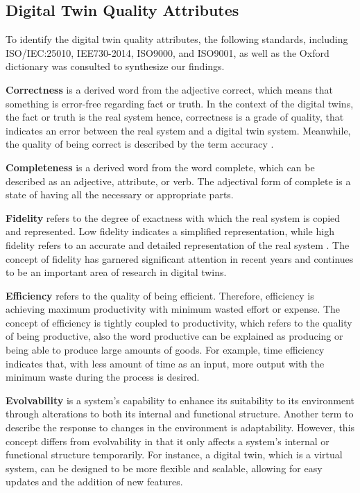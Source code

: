 \documentclass{llncs}
\begin{document}
    \subsection{Digital Twin Quality Attributes}\label{section:Digital Twin Quality Attributes}
    To identify the digital twin quality attributes, the following standards, including ISO/IEC:25010, IEE730-2014, ISO9000, and ISO9001, 
    as well as the Oxford dictionary was consulted to 
    synthesize our findings\cite{ISO9000,ISO90012015,ISO/IEC:25010,IEE730-2014, OxfordDictionary}.
    
    \textbf{Correctness} is a  derived word from the adjective correct, which means that something is error-free regarding fact or truth. 
    In the context of the digital twins, the fact or truth is the real system hence, correctness is a grade of quality, 
    that indicates an error between the real system and a digital twin system.
    Meanwhile, the quality of being correct is described by the term accuracy \cite{OxfordDictionary}. 
    
    \textbf{Completeness} is a derived word from the word complete, which can be described as an adjective, attribute, or verb\cite{OxfordDictionary}. 
    The adjectival form of complete is a state of having all the necessary or appropriate parts\cite{OxfordDictionary}.

    \textbf{Fidelity} refers to the degree of exactness with which the real system is copied and represented. 
    Low fidelity indicates a simplified representation, while high fidelity refers to an accurate and detailed representation of the real system \cite{Review2}. 
    The concept of fidelity has garnered significant attention in recent
    years and continues to be an important area of research in digital twins\cite{Review2}\cite{Review1}.

    \textbf{Efficiency} refers to the quality of being efficient\cite{OxfordDictionary}. Therefore, efficiency is achieving
    maximum productivity with minimum wasted effort or expense. The concept of efficiency is tightly coupled to productivity, which refers to the quality of being productive,
    also the word productive can be explained as producing or being able to produce large amounts of goods\cite{OxfordDictionary}.  
    For example, time efficiency indicates that,  with less amount of time as an input, more output with the minimum 
    waste during the process is desired. 

    \textbf{Evolvability} is a system's capability to enhance its suitability to its environment through alterations to both its internal and functional 
    structure\cite{MobusSystemTheory}. Another term to describe the response to changes in the environment is adaptability.
    However, this concept differs from evolvability in that it only affects a system's internal or functional structure temporarily. 
    For instance, a digital twin, which is a virtual system, can be designed to be more flexible and scalable, 
    allowing for easy updates and the addition of new features\cite{ZHANGUPDATEMETHOD}.
    
\end{document}
